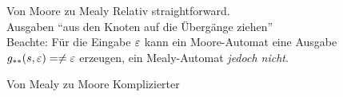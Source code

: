 \begin{frame}{}
\end{frame}



\begin{frame}{}
	\begin{block}{Von Moore zu Mealy}
		Relativ straightforward.\\
		Ausgaben \enquote{aus den Knoten auf die Übergänge ziehen}\\
		Beachte: Für die Eingabe $\varepsilon$ kann ein Moore-Automat eine Ausgabe $g_{**}(s, \varepsilon) = \neq \varepsilon$ erzeugen, ein Mealy-Automat \emph{jedoch nicht}.
	\end{block}

	\begin{block}{Von Mealy zu Moore}
		Komplizierter
	\end{block}
\end{frame}



